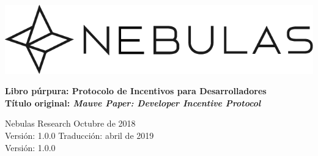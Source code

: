 \documentclass[12pt]{article}
\begin{document}
\pagestyle{empty}

\pagecolor{\pcolor}

\begin{titlepage}
  \begin{center}
    \vspace*{5.5cm}
    \includegraphics[scale=0.5]{../common/Nebulas.png}
    \vspace{0.5cm}

    \textbf{\huge{Libro púrpura: Protocolo de Incentivos para Desarrolladores}}\\
    \textbf{Título original: \textit{Mauve Paper: Developer Incentive Protocol}}

    \vspace{0.5cm}
    Nebulas Research
    \vfill
    Octubre de 2018\\
    Versión: 1.0.0
    \vfill
    Traducción: abril de 2019\\
    Versión: 1.0.0
    \textbf{}
  \end{center}

\end{titlepage}
\setcounter{page}{0}
\tableofcontents
\newpage
\setcounter{page}{1}
\pagestyle{fancy}
\vspace*{0.01cm}









\newpage
\begin{appendices}


\end{appendices}
\end{document}
